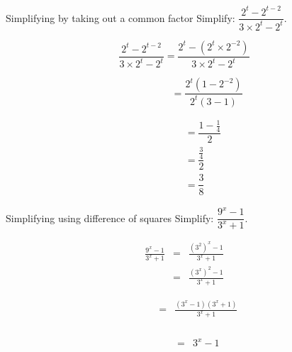 
\begin{wex}
{Simplifying by taking out a common factor}
{Simplify: $\dfrac{2^t-2^{t-2}}{3 \times 2^t - 2^t}$.}
{%
\begin{equation*}
  \dfrac{2^t-2^{t-2}}{3 \times 2^t-2^t} =
  \dfrac{2^t-(2^t \times 2^{-2})}{3 \times 2^t - 2^t}
\end{equation*}

\begin{equation*}
  \phantom{\frac{2^t-2^{t-2}}{3 \times 2^t-2^t}} = \frac{2^t(1-2^{-2})}{2^t(3-1)}
\end{equation*}

\begin{align*}
  \phantom{\frac{2^t-2^{t-2}}{3.2^t-2^t}}
  &= \dfrac{1- \frac{1}{4}}{2} \\
  &= \dfrac{\frac{3}{4}}{2} \\
  &= \dfrac{3}{8} 
\end{align*}
} 
\end{wex}


\begin{wex}
{Simplifying using difference of squares}
{Simplify: $\dfrac{9^x-1}{3^x+1}$.}
{
\begin{eqnarray*}
 \frac{9^x-1}{3^x+1} & = & \frac{(3^2)^x -1}{3^x+1} \\
		     & = & \frac{(3^x)^2-1}{3^x+1} 
\end{eqnarray*}

\begin{eqnarray*}
 \phantom{\frac{9^x-1}{3^x+1}} & = & \frac{(3^x-1)(3^x+1)}{3^x+1}\\
\end{eqnarray*}

\begin{eqnarray*}
 \phantom{\frac{9^x-1}{3^x+1}} & = & 3^x-1\\
\end{eqnarray*}
}
\end{wex}


